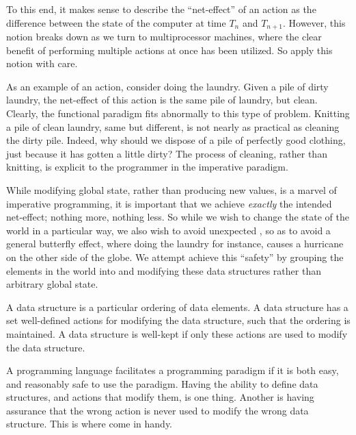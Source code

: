 To this end, it makes sense to describe the ``net-effect'' of an action as the
difference between the state of the computer at time $T_n$ and $T_{n+1}$.
However, this notion breaks down as we turn to multiprocessor machines, where
the clear benefit of performing multiple actions at once has been utilized. So
apply this notion with care.


As an example of an action, consider doing the laundry. Given a pile of dirty
laundry, the net-effect of this action is the same pile of laundry, but clean.
Clearly, the functional paradigm fits abnormally to this type of problem.
Knitting a pile of clean laundry, same but different, is not nearly as
practical as cleaning the dirty pile. Indeed, why should we dispose of a pile
of perfectly good clothing, just because it has gotten a little dirty? The
process of cleaning, rather than knitting, is explicit to the programmer in the
imperative paradigm.

While modifying global state, rather than producing new values, is a marvel of
imperative programming, it is important that we achieve \emph{exactly} the
intended net-effect; nothing more, nothing less. So while we wish to change the
state of the world in a particular way, we also wish to avoid unexpected
, so as to avoid a general butterfly effect, where doing the
laundry for instance, causes a hurricane on the other side of the globe. We
attempt achieve this ``safety'' by grouping the elements in the world into
 and modifying these data structures rather than arbitrary
global state.

\begin{definition}

A data structure is a particular ordering of data elements. A data structure
has a set well-defined actions for modifying the data structure, such that the
ordering is maintained. A data structure is well-kept if only these actions are
used to modify the data structure.

\end{definition}

A programming language facilitates a programming paradigm if it is both easy,
and reasonably safe to use the paradigm. Having the ability to define data
structures, and actions that modify them, is one thing.  Another is having
assurance that the wrong action is never used to modify the wrong data
structure. This is where  come in handy.

